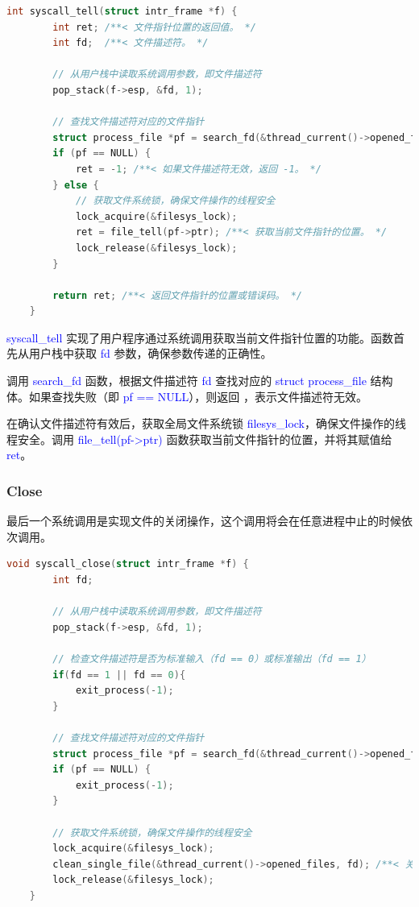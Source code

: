 \documentclass[14pt,a4paper,UTF8,twoside]{article}
\renewcommand{\texttt}[1]{\textcolor{blue}{\ttfamily #1}}
\begin{document}
\begin{lstlisting}[language=C]
    int syscall_tell(struct intr_frame *f) {
        int ret; /**< 文件指针位置的返回值。 */
        int fd;  /**< 文件描述符。 */
    
        // 从用户栈中读取系统调用参数，即文件描述符
        pop_stack(f->esp, &fd, 1);
    
        // 查找文件描述符对应的文件指针
        struct process_file *pf = search_fd(&thread_current()->opened_files, fd);
        if (pf == NULL) {
            ret = -1; /**< 如果文件描述符无效，返回 -1。 */
        } else {
            // 获取文件系统锁，确保文件操作的线程安全
            lock_acquire(&filesys_lock);
            ret = file_tell(pf->ptr); /**< 获取当前文件指针的位置。 */
            lock_release(&filesys_lock);
        }
    
        return ret; /**< 返回文件指针的位置或错误码。 */
    }
    \end{lstlisting}
    
    \begin{cth}
    \texttt{syscall\_tell} 实现了用户程序通过系统调用获取当前文件指针位置的功能。函数首先从用户栈中获取 \texttt{fd} 参数，确保参数传递的正确性。
    
    调用 \texttt{search\_fd} 函数，根据文件描述符 \texttt{fd} 查找对应的 \texttt{struct process\_file} 结构体。如果查找失败（即 \texttt{pf == NULL}），则返回 \texttt{-1}，表示文件描述符无效。
    
    在确认文件描述符有效后，获取全局文件系统锁 \texttt{filesys\_lock}，确保文件操作的线程安全。调用 \texttt{file\_tell(pf->ptr)} 函数获取当前文件指针的位置，并将其赋值给 \texttt{ret}。
    \end{cth}

\subsubsection{Close}

最后一个系统调用是实现文件的关闭操作，这个调用将会在任意进程中止的时候依次调用。

\begin{lstlisting}[language=C]
    void syscall_close(struct intr_frame *f) {
        int fd;
    
        // 从用户栈中读取系统调用参数，即文件描述符
        pop_stack(f->esp, &fd, 1);
    
        // 检查文件描述符是否为标准输入（fd == 0）或标准输出（fd == 1）
        if(fd == 1 || fd == 0){
            exit_process(-1); 
        }
    
        // 查找文件描述符对应的文件指针
        struct process_file *pf = search_fd(&thread_current()->opened_files, fd);
        if (pf == NULL) {
            exit_process(-1);
        }
    
        // 获取文件系统锁，确保文件操作的线程安全
        lock_acquire(&filesys_lock);
        clean_single_file(&thread_current()->opened_files, fd); /**< 关闭并清理指定的文件。 */
        lock_release(&filesys_lock);
    }
    \end{lstlisting}
    
\end{document}
